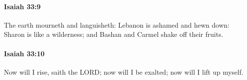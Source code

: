		\paragraph{Isaiah 33:9} %
			\label{ISAIAH-33-9}

			The earth mourneth and languisheth: Lebanon is ashamed and hewn down: Sharon is like a wilderness; and Bashan and Carmel shake off their fruits.


		\paragraph{Isaiah 33:10} %
			\label{ISAIAH-33-10}

			Now will I rise, saith the LORD; now will I be exalted; now will I lift up myself.


